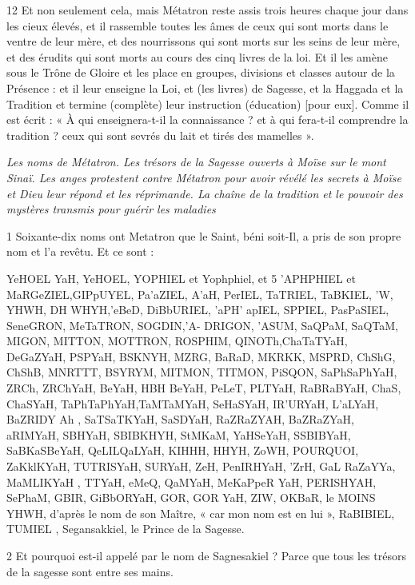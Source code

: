 \par 12 Et non seulement cela, mais Métatron reste assis trois heures chaque jour dans les cieux élevés, et il rassemble toutes les âmes de ceux qui sont morts dans le ventre de leur mère, et des nourrissons qui sont morts sur les seins de leur mère, et des érudits qui sont morts au cours des cinq livres de la loi. Et il les amène sous le Trône de Gloire et les place en groupes, divisions et classes autour de la Présence : et il leur enseigne la Loi, et (les livres) de Sagesse, et la Haggada et la Tradition et termine (complète) leur instruction (éducation) [pour eux]. Comme il est écrit : « À qui enseignera-t-il la connaissance ? et à qui fera-t-il comprendre la tradition ? ceux qui sont sevrés du lait et tirés des mamelles ».



\par \textit{Les noms de Métatron. Les trésors de la Sagesse ouverts à Moïse sur le mont Sinaï. Les anges protestent contre Métatron pour avoir révélé les secrets à Moïse et Dieu leur répond et les réprimande. La chaîne de la tradition et le pouvoir des mystères transmis pour guérir les maladies}

\par 1 Soixante-dix noms ont Metatron que le Saint, béni soit-Il, a pris de son propre nom et l'a revêtu. Et ce sont :

\par YeHOEL YaH, YeHOEL, YOPHIEL et Yophphiel, et 5 'APHPHIEL et MaRGeZIEL,GIPpUYEL, Pa'aZIEL, A'aH, PerIEL, TaTRIEL, TaBKIEL, 'W, YHWH, DH WHYH,'eBeD, DiBbURIEL, 'aPH' apIEL, SPPIEL, PasPaSIEL, SeneGRON, MeTaTRON, SOGDIN,'A- DRIGON, 'ASUM, SaQPaM, SaQTaM, MIGON, MITTON, MOTTRON, ROSPHIM, QINOTh,ChaTaTYaH, DeGaZYaH, PSPYaH, BSKNYH, MZRG, BaRaD, MKRKK, MSPRD, ChShG, ChShB, MNRTTT, BSYRYM, MITMON, TITMON, PiSQON, SaPhSaPhYaH, ZRCh, ZRChYaH, BeYaH, HBH BeYaH, PeLeT, PLTYaH, RaBRaBYaH, ChaS, ChaSYaH, TaPhTaPhYaH,TaMTaMYaH, SeHaSYaH, IR'URYaH, L'aLYaH, BaZRIDY Ah , SaTSaTKYaH, SaSDYaH, RaZRaZYAH, BaZRaZYaH, aRIMYaH, SBHYaH, SBIBKHYH, StMKaM, YaHSeYaH, SSBIBYaH, SaBKaSBeYaH, QeLILQaLYaH, KIHHH, HHYH, ZoWH, POURQUOI, ZaKklKYaH, TUTRISYaH, SURYaH, ZeH, PenIRHYaH, 'ZrH, GaL RaZaYYa, MaMLIKYaH , TTYaH, eMeQ, QaMYaH, MeKaPpeR YaH, PERISHYAH, SePhaM, GBIR, GiBbORYaH, GOR, GOR YaH, ZIW, OKBaR, le MOINS YHWH, d'après le nom de son Maître, « car mon nom est en lui », RaBIBIEL, TUMIEL , Segansakkiel, le Prince de la Sagesse.

\par 2 Et pourquoi est-il appelé par le nom de Sagnesakiel ? Parce que tous les trésors de la sagesse sont entre ses mains.

